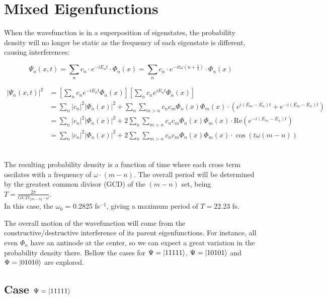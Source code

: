 \documentclass{cis320}
\begin{document}
\section{Mixed Eigenfunctions}
When the wavefunction is in a superposition of eigenstates, the probability density will no longer be static as the frequency of each eigenstate is different, causing interferences:\\
\begin{centering}
\[
\Psi_{n}(x,t) = \sum_{n} c_n \cdot e^{-iE_nt} \cdot \Phi_{n}(x) = \sum_{n} c_n \cdot e^{-it\omega(n+\frac{1}{2})} \cdot \Phi_{n}(x)
\]

\[
\begin{aligned}
|\Psi_{n}(x,t)|^2 &= \left[\sum_{n} c_n e^{-iE_nt} \Phi_n(x)\right] \left[\sum_{n} c_n e^{iE_nt} \Phi_n(x)\right] \\
&= \sum_n |c_n|^2 |\Phi_n(x)|^2 + \sum_n \sum_{m>n} c_n c_m \Phi_n(x) \Phi_m(x) \cdot \left(e^{i(E_m-E_n)t}+e^{-i(E_m-E_n)t}\right) \\
&= \sum_n |c_n|^2 |\Phi_n(x)|^2 + 2\sum_n \sum_{m>n} c_n c_m \Phi_n(x) \Phi_m(x) \cdot \text{Re}\left(e^{-i(E_m-E_n)t}\right) \\
&= \sum_n |c_n|^2 |\Phi_n(x)|^2 + 2 \sum_n \sum_{m>n} c_n c_m \Phi_n(x) \Phi_m(x) \cdot \cos(t\omega(m-n))
\end{aligned}
\]
\end{centering}
\\
The resulting probability density is a function of time where each cross term oscilates with a frequency of $\omega \cdot (m-n)$. The overall period will be determined by the greatest common divisor (GCD) of the $(m-n)$ set, being $T=\frac{2\pi}{GCD_{\{m-n\}}\cdot\omega}$. \\
In this case, the $\omega_0$ = 0.2825 fs$^{-1}$, giving a maximum period of $T=22.23$ fs.\\
\par
The overall motion of the wavefunction will come from the constructive/destructive interference of its parent eigenfunctions. For instance, all even $\Phi_n$ have an antinode at the center, so we can expect a great variation in the probability density there. Bellow the cases for $\Psi = \ket{11111}$, $\Psi = \ket{10101}$ and $\Psi = \ket{01010}$ are explored.


\subsection{Case $\Psi = \ket{11111}$}
\end{document}
